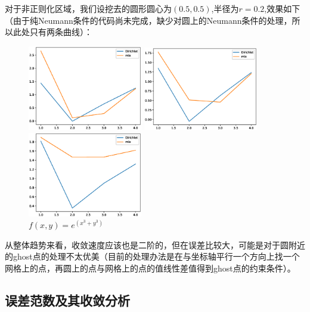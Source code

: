 \documentclass[12]{article}%
\begin{document}
对于非正则化区域，我们设挖去的圆形圆心为$(0.5,0.5)$,半径为$r=0.2$,效果如下（由于纯Neumann条件的代码尚未完成，缺少对圆上的Neumann条件的处理，所以此处只有两条曲线）：
\begin{figure}[H]
    \centering
    \begin{minipage}[t]{0.3\textwidth}
    \centering
    \includegraphics[width=5cm]{../pic/fun1_irregu_points.eps}
    \caption{$f(x,y)=e^(x^3+y^3)$}
    \end{minipage}
    \begin{minipage}[t]{0.3\textwidth}
    \centering
    \includegraphics[width=5cm]{../pic/fun2_irregu_points.eps}
    \caption{$f(x,y)=sin(3x+3y)$}
    \end{minipage}
    \begin{minipage}[t]{0.3\textwidth}
    \centering
    \includegraphics[width=5cm]{../pic/fun3_irregu_points.eps}
    \caption{$f(x,y)=e^(x^3+y^3)$}
    \end{minipage}
\end{figure}
从整体趋势来看，收敛速度应该也是二阶的，但在误差比较大，可能是对于圆附近的ghost点的处理不太优美（目前的处理办法是在与坐标轴平行一个方向上找一个网格上的点，再圆上的点与网格上的点的值线性差值得到ghost点的约束条件）。

\subsection{误差范数及其收敛分析}
\end{document}
